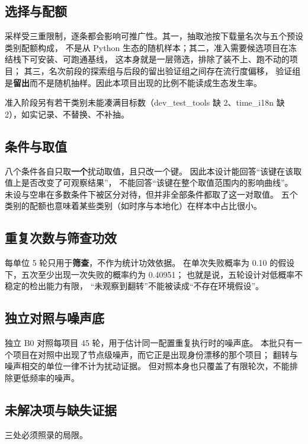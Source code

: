 \documentclass[11pt]{ctexart}
\begin{document}
\subsection{选择与配额}

采样受三重限制，逐条都会影响可推广性。其一，抽取池按下载量名次与五个预设类别配额构成，
不是从 Python 生态的随机样本；其二，准入需要候选项目在冻结栈下可安装、可跑通基线，
这本身就是一层筛选，排除了装不上、跑不动的项目；
其三，名次前段的探索组与后段的留出验证组之间存在流行度偏移，
验证组是\textbf{留出}而不是随机抽样。因此本项目出现的比例不能读成生态发生率。

准入阶段另有若干类别未能凑满目标数（dev\_test\_tools 缺 2、time\_i18n 缺 2），如实记录、不替换、不补抽。

\subsection{条件与取值}

八个条件各自只取\textbf{一个}扰动取值，且只改一个键。
因此本设计能回答“该键在该取值上是否改变了可观察结果”，
不能回答“该键在整个取值范围内的影响曲线”。
未设与空串在多数条件下被区分对待，但并非全部条件都取了这一对取值。
五个类别的配额也意味着某些类别（如时序与本地化）在样本中占比很小。

\subsection{重复次数与筛查功效}

每单位 5 轮只用于\textbf{筛查}，不作为统计功效依据。
在单次失败概率为 0.10 的假设下，五次至少出现一次失败的概率约为 0.40951；
也就是说，五轮设计对低概率不稳定的检出能力有限，
“未观察到翻转”不能被读成“不存在环境假设”。

\subsection{独立对照与噪声底}

独立 B0 对照每项目 45 轮，用于估计同一配置重复执行时的噪声底。
本批只有一个项目在对照中出现了节点级噪声，而它正是出现身份漂移的那个项目；
翻转与噪声相交的单位一律不计为扰动证据。
但对照本身也只覆盖了有限轮次，不能排除更低频率的噪声。

\subsection{未解决项与缺失证据}

三处必须照录的局限。
\end{document}
